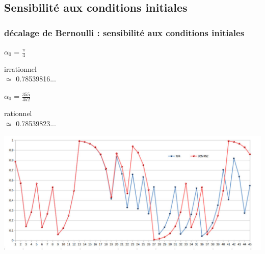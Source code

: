 \documentclass{beamer}
\begin{document}
\subsection{Sensibilité aux conditions initiales}
\begin{frame}
  \frametitle{décalage de Bernoulli : sensibilité aux conditions initiales}
  \begin{minipage}{0.49\textwidth}
    \begin{center}
      {\Large \textcolor{bleu}{$\alpha_0$} = $\frac{\pi}{4}$ \par} 
      \medskip
      irrationnel \\
      $\simeq$ 0.785398\textcolor{bleu}{16}...
    \end{center} 
  \end{minipage}
  \begin{minipage}{0.49\textwidth}
    \begin{center}
      {\Large \textcolor{rouge}{$\alpha_0$} = $\frac{355}{452}$ \par}
      \medskip
      rationnel \\
      $\simeq$ 0.785398\textcolor{rouge}{23}...
    \end{center}
  \end{minipage}
  \includegraphics[scale=1.33]{img/comparaison.png}
\end{frame}
\end{document}
